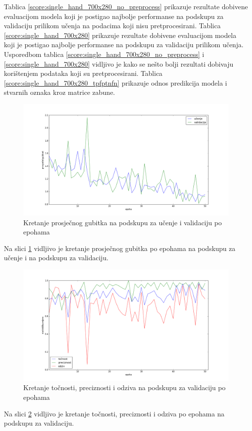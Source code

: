 \documentclass[times, utf8, diplomski, numeric]{fer}
\begin{document}
\noindent Tablica \ref{score:single_hand_700x280_no_preprocess} prikazuje rezultate dobivene evaluacijom modela koji je postigao najbolje performanse na podskupu za validaciju prilikom učenja na podacima koji nisu pretprocesirani.
Tablica \ref{score:single_hand_700x280} prikazuje rezultate dobivene evaluacijom modela koji je postigao najbolje performanse na podskupu za validaciju prilikom učenja.
Usporedbom tablica \ref{score:single_hand_700x280_no_preprocess} i \ref{score:single_hand_700x280} vidljivo je kako se nešto bolji rezultati dobivaju korištenjem podataka koji su pretprocesirani.
Tablica \ref{score:single_hand_700x280_tpfptnfn} prikazuje odnos predikcija modela i stvarnih oznaka kroz matrice zabune.

\begin{figure}[H]
\centering
\includegraphics[scale=0.35]{images/single_hand_scale1_loss.png}
\caption{Kretanje prosječnog gubitka na podskupu za učenje i validaciju po epohama}
\label{img:single_hand_scale1_loss}
\end{figure}
\noindent Na slici \ref{img:single_hand_scale1_loss} vidljivo je kretanje prosječnog gubitka po epohama na podskupu za učenje i na podskupu za validaciju.

\begin{figure}[H]
\centering
\includegraphics[scale=0.35]{images/single_hand_scale1_acc_ap.png}
\caption{Kretanje točnosti, preciznosti i odziva na podskupu za validaciju po epohama}
\label{img:single_hand_scale1_acc_ap}
\end{figure}
\noindent Na slici \ref{img:single_hand_scale1_acc_ap} vidljivo je kretanje točnosti, preciznosti i odziva po epohama na podskupu za validaciju.
\end{document}
